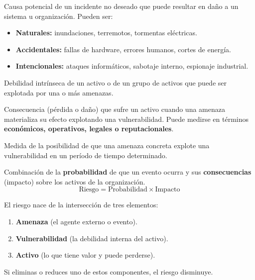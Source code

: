 \documentclass[11pt,a4paper]{article}
\begin{document}
\begin{definicion}[Amenaza]
Causa potencial de un incidente no deseado que puede resultar en daño a un sistema u organización. Pueden ser:
\begin{itemize}[leftmargin=*]
  \item \textbf{Naturales:} inundaciones, terremotos, tormentas eléctricas.
  \item \textbf{Accidentales:} fallas de hardware, errores humanos, cortes de energía.
  \item \textbf{Intencionales:} ataques informáticos, sabotaje interno, espionaje industrial.
\end{itemize}
\end{definicion}

\begin{definicion}[Vulnerabilidad]
Debilidad intrínseca de un activo o de un grupo de activos que puede ser explotada por una o más amenazas.
\end{definicion}

\begin{definicion}[Impacto]
Consecuencia (pérdida o daño) que sufre un activo cuando una amenaza materializa su efecto explotando una vulnerabilidad. Puede medirse en términos \textbf{económicos, operativos, legales o reputacionales}.
\end{definicion}

\begin{definicion}[Probabilidad]
Medida de la posibilidad de que una amenaza concreta explote una vulnerabilidad en un período de tiempo determinado.
\end{definicion}

\begin{definicion}[Riesgo]
Combinación de la \textbf{probabilidad} de que un evento ocurra y sus \textbf{consecuencias} (impacto) sobre los activos de la organización.
\[
\text{Riesgo} = \text{Probabilidad} \times \text{Impacto}
\]
\end{definicion}

\begin{clave}
El riesgo nace de la intersección de tres elementos:
\begin{enumerate}[leftmargin=*]
  \item \textbf{Amenaza} (el agente externo o evento).
  \item \textbf{Vulnerabilidad} (la debilidad interna del activo).
  \item \textbf{Activo} (lo que tiene valor y puede perderse).
\end{enumerate}
Si eliminas o reduces uno de estos componentes, el riesgo disminuye.
\end{clave}
\end{document}

